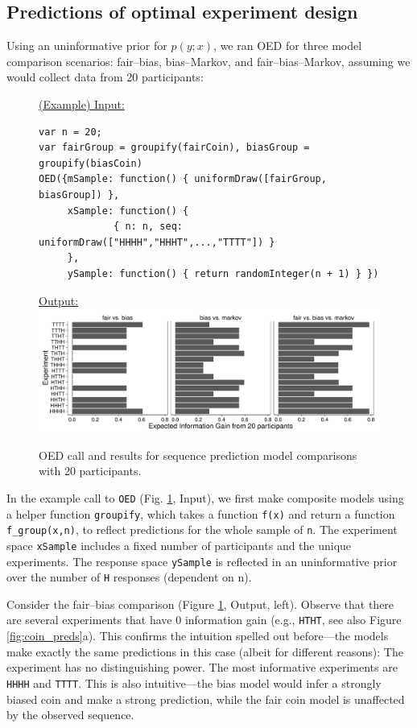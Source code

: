 \documentclass{article}
\begin{document}
\subsection{Predictions of optimal experiment design}

Using an uninformative prior for $p(y; x)$, we ran OED for three model comparison scenarios: fair--bias, bias--Markov, and fair--bias--Markov, assuming we would collect data from 20 participants:

\begin{figure}[h]
\underline{\textsf{(Example) Input:}}
\begin{lstlisting}
var n = 20;
var fairGroup = groupify(fairCoin), biasGroup = groupify(biasCoin)
OED({mSample: function() { uniformDraw([fairGroup, biasGroup]) },
     xSample: function() {
    		 { n: n, seq: uniformDraw(["HHHH","HHHT",...,"TTTT"]) }
   	 },
     ySample: function() { return randomInteger(n + 1) } })
\end{lstlisting}
\underline{\textsf{Output:}}\\
\includegraphics[width=\columnwidth]{img/coin_eig_n20_ignorance.pdf}
\caption{OED call and results for sequence prediction model comparisons with 20 participants.}
\label{fig:run-coin}
\end{figure}
In the example call to \lstinline{OED} (Fig. \ref{fig:run-coin}, Input), we first make composite models using a helper function \lstinline{groupify}, which takes  a function \lstinline{f(x)} and return a function \lstinline{f_group(x,n)}, to reflect predictions for the whole sample of \lstinline{n}.
The experiment space \lstinline{xSample} includes a fixed number of participants and the unique experiments.
The response space \lstinline{ySample} is reflected in an uninformative prior over the number of \lstinline{H} responses (dependent on n).

Consider the fair--bias comparison (Figure \ref{fig:run-coin}, Output, left).
Observe that there are several experiments that have 0 information gain (e.g., \lstinline{HTHT}, see also Figure \ref{fig:coin_preds}a).
This confirms the intuition spelled out before---the models make exactly the same predictions in this case (albeit for different reasons): The experiment has no distinguishing power.
The most informative experiments are \lstinline{HHHH} and \lstinline{TTTT}.
This is also intuitive---the bias model would infer a strongly biased coin and make a strong prediction, while the fair coin model is unaffected by the observed sequence.
\end{document}
